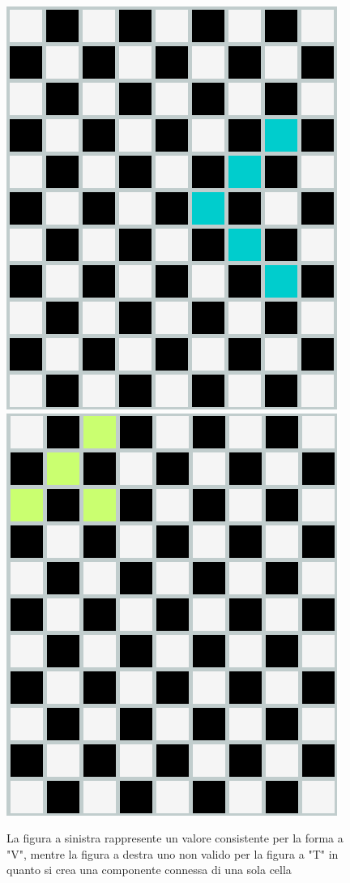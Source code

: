\clearpage


\begin{figure}[h]
	\centering
	{\includegraphics[scale=0.35]{immagini/goodCC}}
	\hspace{5mm}
	{\includegraphics[scale=0.35]{immagini/badCC}}
	\caption{La figura a sinistra rappresente un valore consistente per la forma a "V", mentre la figura a destra uno non valido per la figura a "T" in quanto si crea una componente connessa di una sola cella}
	\label{fig:badCC}
\end{figure}

